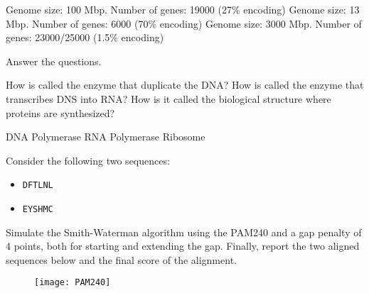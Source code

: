 \begin{Answer} [
  ref={ex2},
  number={2}
 ]

  \Question Genome size: 100 Mbp. Number of genes: 19000 (27\% encoding)
  \Question Genome size: 13 Mbp. Number of genes: 6000 (70\% encoding)
  \Question Genome size: 3000 Mbp. Number of genes: 23000/25000 (1.5\% encoding)

\end{Answer}

\begin{Exercise} [
  title={Enzyme},
  difficulty={1},
  label={ex3},
  origin={G. Valle}
 ]

  Answer the questions.

  \Question How is called the enzyme that duplicate the DNA?
  \Question How is called the enzyme that transcribes DNS into RNA?
  \Question How is it called the biological structure where proteins are
synthesized?
\end{Exercise}

\begin{Answer} [
  ref={ex3},
  number={3}
 ]

  \Question DNA Polymerase
  \Question RNA Polymerase
  \Question Ribosome
\end{Answer}

\begin{Exercise} [
  title={Smith and Waterman algorithm},
  difficulty={1},
  label={exSW},
  origin={G. Valle}
 ]
 
 Consider the following two sequences:

 \begin{itemize}
  \item \texttt{DFTLNL}
  \item \texttt{EYSHMC}
 \end{itemize}

 Simulate the Smith-Waterman algorithm using the PAM240 and a gap penalty of
 4 points, both for starting and extending the gap.
 Finally, report the two aligned sequences below and the final score of the
 alignment.

 \begin{figure}[H]
  \centering
  \texttt{[image: PAM240]}
 \end{figure}

\end{Exercise}

\newpage

